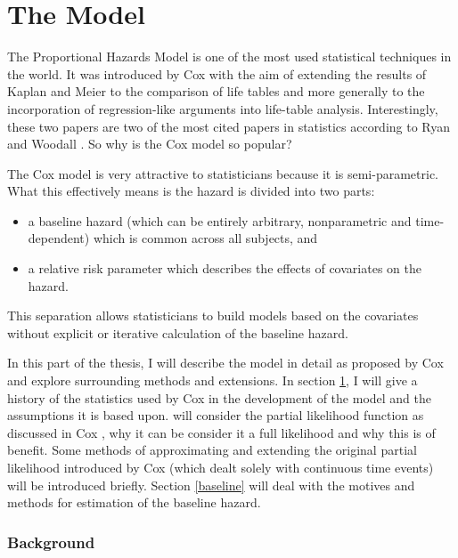 \newpage
\part{The Model}\label{sec:model}

The Proportional Hazards Model is one of the most used statistical techniques in the world. It was introduced by Cox  with the aim of extending the results of Kaplan and Meier  to the comparison of life tables and more generally to the incorporation of regression-like arguments into life-table analysis. Interestingly, these two papers are two of the most cited papers in statistics according to Ryan and Woodall . So why is the Cox model so popular?

The Cox model is very attractive to statisticians because it is semi-parametric. What this effectively means is the hazard is divided into two parts:

\begin{itemize}
    \item a baseline hazard (which can be entirely arbitrary, nonparametric and time-dependent) which is common across all subjects, and
    \item a relative risk parameter which describes the effects of covariates on the hazard.
\end{itemize} 

This separation allows statisticians to build models based on the covariates without explicit or iterative calculation of the baseline hazard.

In this part of the thesis, I will describe the model in detail as proposed by Cox and explore surrounding methods and extensions. In section \ref{background}, I will give a history of the statistics used by Cox in the development of the model and the assumptions it is based upon.  will consider the partial likelihood function as discussed in Cox , why it can be consider it a full likelihood and why this is of benefit. Some methods of approximating and extending the original partial likelihood introduced by Cox  (which dealt solely with continuous time events) will be introduced briefly. Section \ref{baseline} will deal with the motives and methods for estimation of the baseline hazard.

\section{Background}\label{background}

